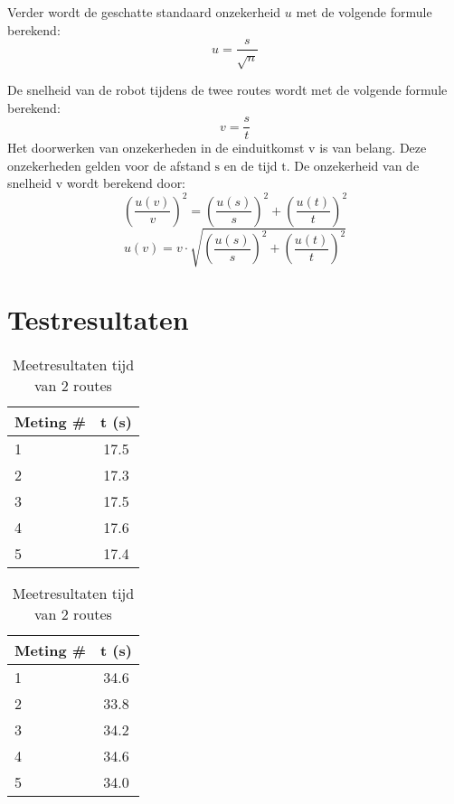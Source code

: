 \documentclass{report}
\begin{document}
Verder wordt de geschatte standaard onzekerheid $u$ met de volgende formule berekend:
\begin{equation}
\label{eq:onzekerheid}
u=\frac{s}{\sqrt{n}}
\end{equation}

De snelheid van de robot tijdens de twee routes wordt met de volgende formule berekend:
\begin{equation}
\label{snelheid}
v=\frac{s}{t}
\end{equation}
Het doorwerken van onzekerheden in de einduitkomst $\mathrm{v}$ is van belang. Deze onzekerheden gelden voor de afstand $\mathrm{s}$ en de tijd $\mathrm{t}$. De onzekerheid van de snelheid $\mathrm{v}$ wordt berekend door:
\begin{equation}
\left(\frac{u(v)}{v}\right)^2=\left(\frac{u(s)}{s}\right)^2+\left(\frac{u(t)}{t}\right)^2
\end{equation}
\begin{equation}
\label{eq:onzSnelheid}
u(v)=v\cdot\sqrt{\left(\frac{u(s)}{s}\right)^2+\left(\frac{u(t)}{t}\right)^2}
\end{equation}

\section{Testresultaten}
\label{sec:testresultaten}

\begin{table}[H]
	\centering
	\begin{subtable}{0.40\textwidth}
		\centering
			\begin{tabular}{| l| c|}
		\hline
		   Meting \# & t (s) \\
		\hline
		   1& 17.5 \\
		\hline
		   2& 17.3 \\
		\hline
		   3& 17.5 \\
		\hline
		   4& 17.6 \\
		\hline
		   5& 17.4 \\
		\hline
		\end{tabular}
		\label{tab:timea}
	\end{subtable}
	\quad
	\begin{subtable}{0.40\textwidth}
		\centering
		\begin{tabular}{| l| c|}
		\hline
		   Meting \# & t (s) \\
		\hline
		   1& 34.6\\
		\hline
		   2& 33.8\\
		\hline
		   3& 34.2\\
		\hline
		  4& 34.6\\
		\hline
		   5& 34.0 \\
		\hline
		\end{tabular}
		\label{tab:timeb}
	\end{subtable}
	\caption{Meetresultaten tijd van 2 routes}
	\label{tab:measurementtime}
\end{table}
\end{document}
